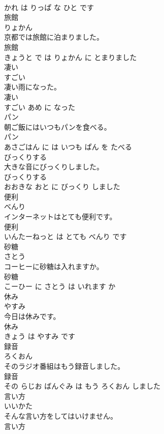 \documentclass[8pt]{extreport}
\begin{document}
\begin{CJK}{UTF8}{min}
\\	かれ は りっぱ な ひと です			
\\	旅館	
\\	りょかん			
\\	京都では旅館に泊まりました。	
\\	旅館 
\\	きょうと で は りょかん に とまりました			
\\	凄い	
\\	すごい			
\\	凄い雨になった。	
\\	凄い 
\\	すごい あめ に なった			
\\	パン	
\\	朝ご飯にはいつもパンを食べる。	
\\	パン 
\\	あさごはん に は いつも ぱん を たべる			
\\	びっくりする	
\\	大きな音にびっくりしました。	
\\	びっくりする 
\\	おおきな おと に びっくり しました			
\\	便利	
\\	べんり			
\\	インターネットはとても便利です。	
\\	便利 
\\	いんたーねっと は とても べんり です			
\\	砂糖	
\\	さとう			
\\	コーヒーに砂糖は入れますか。	
\\	砂糖 
\\	こーひー に さとう は いれます か			
\\	休み	
\\	やすみ			
\\	今日は休みです。	
\\	休み 
\\	きょう は やすみ です			
\\	録音	
\\	ろくおん			
\\	そのラジオ番組はもう録音しました。	
\\	録音 
\\	その らじお ばんぐみ は もう ろくおん しました			
\\	言い方	
\\	いいかた			
\\	そんな言い方をしてはいけません。	
\\	言い方 

\end{CJK}
\end{document}
